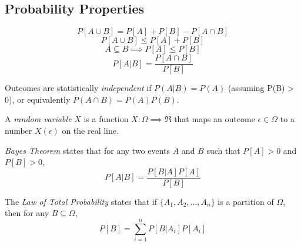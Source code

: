 \subsection{Probability Properties}
\begin{equation}
    P\left[A \cup B\right] = P\left[A\right] + P\left[B\right] - P\left[A \cap B\right]
\end{equation}
\begin{equation}
    P\left[A \cup B\right] \leq P\left[A\right] + P\left[B\right]
\end{equation}
\begin{equation}
    A \subseteq B \implies P\left[A\right] \leq P\left[B\right]
\end{equation}
\begin{equation}
    P\left[A | B\right] = \frac{P[A \cap B]}{P[B]}
\end{equation}

Outcomes are statistically \emph{independent} if
$P(A|B) = P(A)$ (assuming P(B) > 0), or
equivalently $P(A \cap B) = P(A)P(B)$.

A \emph{random variable} $X$ is a function $X : \Omega \implies \Re$
that maps an outcome $\epsilon \in \Omega$ to a number $X(\epsilon)$ on the real line.

\emph{Bayes Theorem} states that for any two events $A$ and $B$ such that $P[A] > 0$ and
$P[B] > 0$,
\begin{equation}
    P[A|B] = \frac{P[B|A]P[A]}{P[B]}
\end{equation}

The \emph{Law of Total Probability} states that if
$\{A_1, A_2, \dots, A_n\}$ is a partition of $\Omega$,
then for any $B \subseteq \Omega$,
\begin{equation}
    P[B] = \sum_{i = 1}^{n} P[B|A_i]P[A_i]
\end{equation}